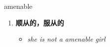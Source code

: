 
\begin{frame}
{\huge amenable}
\begin{center}
\begin{enumerate}\Large
  \item \textbf{顺从的，服从的}
  \begin{itemize}
    \item \em{\Large{she is not a amenable girl}}
  \end{itemize}
\end{enumerate}
\end{center}
\end{frame}
